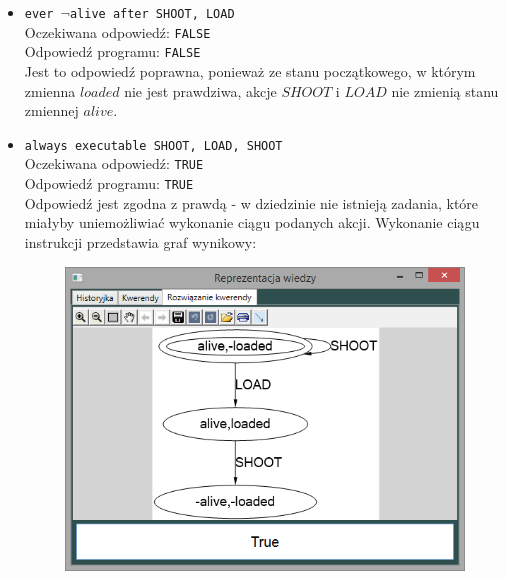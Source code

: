 \documentclass{article}
\begin{document}
\begin{itemize}
    \newpage
    \item {\large\texttt{ever $\neg$alive after SHOOT, LOAD}}\\
    Oczekiwana odpowiedź: \texttt{FALSE}\\
    Odpowiedź programu: \texttt{FALSE}\\
    Jest to odpowiedź poprawna, ponieważ ze stanu początkowego, w którym zmienna $loaded$ nie jest prawdziwa, akcje $SHOOT$ i $LOAD$ nie zmienią stanu zmiennej $alive$.
    \item {\large\texttt{always executable SHOOT, LOAD, SHOOT}}\\
    Oczekiwana odpowiedź: \texttt{TRUE}\\
    Odpowiedź programu: \texttt{TRUE}\\
    Odpowiedź jest zgodna z prawdą - w dziedzinie nie istnieją zadania, które miałyby uniemożliwiać wykonanie ciągu podanych akcji. Wykonanie ciągu instrukcji przedstawia graf wynikowy:
    \begin{figure}[H]
    \centering
    \includegraphics[scale=0.5]{test1_4}
    \end{figure}
\end{itemize}

\newpage
\end{document}
